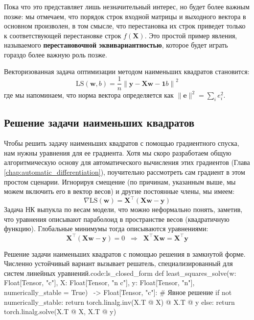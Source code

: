 Пока что это представляет лишь незначительный интерес, но будет более важным позже: мы отмечаем, что порядок строк входной матрицы и выходного вектора в основном произволен, в том смысле, что перестановка их строк приведет только к соответствующей перестановке строк $f(\mathbf{X})$. Это простой пример явления, называемого \textbf{перестановочной эквивариантностью}, которое будет играть гораздо более важную роль позже.

Векторизованная задача оптимизации методом наименьших квадратов становится:
%
\begin{equation}
\text{LS}(\mathbf{w},b) =  \frac{1}{n} \left\lVert \mathbf{y} - \mathbf{X}\mathbf{w} - \mathbf{1}b \right\rVert^2 
\label{eq:ls_vectorized}
\end{equation}
%
где мы напоминаем, что норма вектора определяется как $\lVert \mathbf{e} \rVert^2 = \sum_i e_i^2$.

\subsection{Решение задачи наименьших квадратов}

Чтобы решить задачу наименьших квадратов с помощью градиентного спуска, нам нужны уравнения для ее градиента. Хотя мы скоро разработаем общую алгоритмическую основу для автоматического вычисления этих градиентов (Глава \ref{chap:automatic_differentiation}), поучительно рассмотреть сам градиент в этом простом сценарии. Игнорируя смещение (по причинам, указанным выше, мы можем включить его в вектор весов) и другие постоянные члены, мы имеем:
%
$$
\nabla \text{LS}(\mathbf{w}) = \mathbf{X}^\top\left( \mathbf{X}\mathbf{w} - \mathbf{y} \right)
$$
%
Задача НК выпукла по весам модели, что можно неформально понять, заметив, что уравнения описывают параболоид в пространстве весов (квадратичную функцию). Глобальные минимумы тогда описываются уравнениями:
%
$$
\mathbf{X}^\top\left( \mathbf{X}\mathbf{w} - \mathbf{y} \right) = 0 \;\;\Rightarrow\;\; \mathbf{X}^\top\mathbf{X}\mathbf{w} = \mathbf{X}^\top\mathbf{y}
$$

\begin{mypy}{Решение задачи наименьших квадратов с помощью решения в замкнутой форме. Численно устойчивый вариант вызывает решатель, специализированный для систем линейных уравнений.}{code:ls_closed_form}
def least_squares_solve(w: Float[Tensor, "c"],
                        X: Float[Tensor, "n c"],
                        y: Float[Tensor, "n"],
                        numerically_stable = True) \
                        -> Float[Tensor, "c"]:
  # Явное решение
  if not numerically_stable:
    return torch.linalg.inv(X.T @ X) @ X.T @ y 
  else:
    return torch.linalg.solve(X.T @ X, X.T @ y)
\end{mypy}

